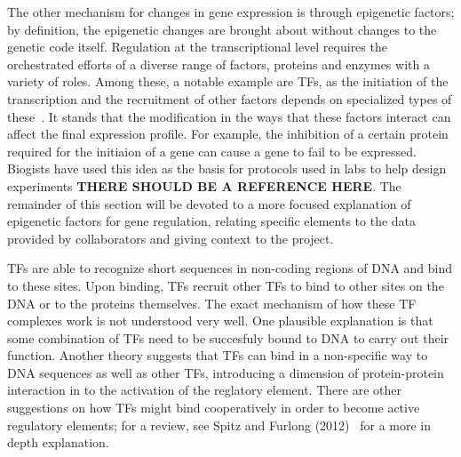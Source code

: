         The other mechanism for changes in gene expression is through epigenetic factors; by definition, the epigenetic changes are brought about without changes to the genetic code itself.
        Regulation at the transcriptional level requires the orchestrated efforts of a diverse range of factors, proteins and enzymes with a variety of roles. Among these, a notable example are TFs, as the initiation of the transcription and the recruitment of other factors depends on specialized types of these~\cite{lemon2000orchestrated}. It stands that the modification in the ways that these factors interact can affect the final expression profile. For example, the inhibition of a certain protein required for the initiaion of a gene can cause a gene to fail to be expressed. Biogists have used this idea as the basis for protocols used in labs to help design experiments \textbf{THERE SHOULD BE A REFERENCE HERE}. The remainder of this section will be devoted to a more focused explanation of epigenetic factors for gene regulation, relating specific elements to the data provided by collaborators and giving context to the project. 
        

        TFs are able to recognize short sequences in non-coding regions of DNA and bind to these sites. 
        Upon binding, TFs recruit other TFs to bind to other sites on the DNA or to the proteins themselves.
        The exact mechanism of how these TF complexes work is not understood very well. 
        One plausible explanation is that some combination of TFs need to be succesfuly bound to DNA to carry out their function.
        Another theory suggests that TFs can bind in a non-specific way to DNA sequences as well as other TFs, introducing 
        a dimension of protein-protein interaction in to the activation of the reglatory element. 
        There are other suggestions on how TFs might bind cooperatively in order to become active regulatory elements; for a review, 
        see Spitz and Furlong (2012)~\cite{spitz2012transcription} for a more in depth explanation. 


	
